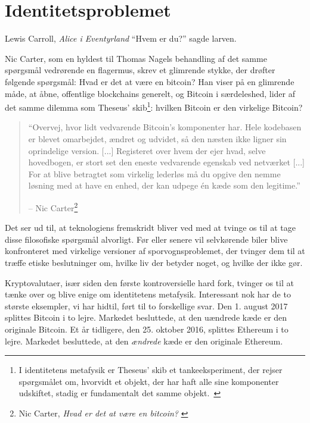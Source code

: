 \chapter{Identitetsproblemet}
\label{les:4}

\begin{chapquote}{Lewis Carroll, \textit{Alice i Eventyrland}}
\enquote{Hvem er du?} sagde larven.
\end{chapquote}

Nic Carter, som en hyldest til Thomas Nagels behandling af det samme spørgsmål 
vedrørende en flagermus, skrev et glimrende stykke, der drøfter følgende 
spørgsmål: Hvad er det at være en bitcoin? Han viser på en glimrende måde, at 
åbne, offentlige blockchains generelt, og Bitcoin i særdeleshed, lider af det 
samme dilemma som Theseus' skib\footnote{I identitetens metafysik er Theseus' 
skib et tankeeksperiment, der rejser spørgsmålet om, hvorvidt et objekt, der 
har haft alle sine komponenter udskiftet, stadig er fundamentalt det samme 
objekt.~\cite{wiki:theseus}}: hvilken Bitcoin er den virkelige Bitcoin?

\begin{quotation}\begin{samepage}
\enquote{Overvej, hvor lidt vedvarende Bitcoin's komponenter har. Hele 
kodebasen er blevet omarbejdet, ændret og udvidet, så den næsten ikke ligner 
sin oprindelige version. [...] Registeret over hvem der ejer hvad, selve 
hovedbogen, er stort set den eneste vedvarende egenskab ved netværket [...]
For at blive betragtet som virkelig lederløs må du opgive den nemme løsning med 
at have en enhed, der kan udpege én kæde som den legitime.}
\begin{flushright} -- Nic Carter\footnote{Nic Carter, \textit{Hvad er det at 
    være en bitcoin?} \cite{bitcoin-identity}}
\end{flushright}\end{samepage}\end{quotation}

Det ser ud til, at teknologiens fremskridt bliver ved med at tvinge os til at 
tage disse filosofiske spørgsmål alvorligt. Før eller senere vil selvkørende 
biler blive konfronteret med virkelige versioner af sporvognsproblemet, der 
tvinger dem til at træffe etiske beslutninger om, hvilke liv der betyder noget, 
og hvilke der ikke gør.

Kryptovalutaer, især siden den første kontroversielle hard fork, tvinger os til 
at tænke over og blive enige om identitetens metafysik. Interessant nok har de 
to største eksempler, vi har hidtil, ført til to forskellige svar. Den 1. 
august 2017 splittes Bitcoin i to lejre. Markedet besluttede, at den uændrede 
kæde er den originale Bitcoin. Et år tidligere, den 25. oktober 2016, splittes 
Ethereum i to lejre. Markedet besluttede, at den \textit{ændrede} kæde er den 
originale Ethereum.

